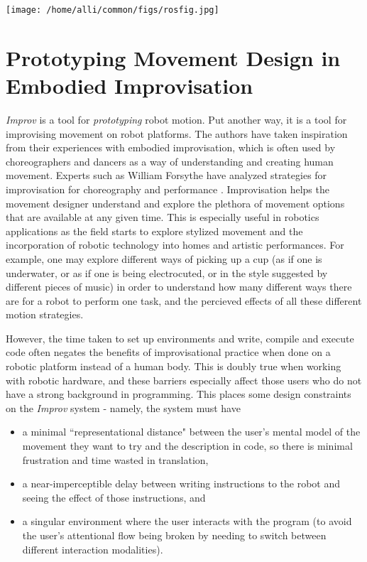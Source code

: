 \documentclass[sigconf]{acmart}
\begin{document}
\begin{figure*}
 \centering
\texttt{[image: /home/alli/common/figs/rosfig.jpg]}
\end{figure*}



\section{Prototyping Movement Design in Embodied Improvisation}\label{embodied}

\emph{Improv} is a tool for \emph{prototyping} robot motion. Put another way, it
is a tool for improvising movement on robot platforms. The authors have taken
inspiration from their experiences with embodied improvisation, which is often
used by choreographers and dancers as a way of understanding and creating human
movement. Experts such as William Forsythe have analyzed strategies for
improvisation for choreography and performance \cite{forsythe2004improvisation}.
Improvisation helps the movement designer understand and explore the plethora of
movement options that are available at any given time. This is especially useful
in robotics applications as the field starts to explore stylized movement and
the incorporation of robotic technology into homes and artistic performances. For
example, one may explore different ways of picking up a cup (as if one is
underwater, or as if one is being electrocuted, or in the style suggested by
different pieces of music) in order to understand how many different ways there
are for a robot to perform one task, and the percieved effects of all these
different motion strategies.

However, the time taken to set up environments and write, compile and
execute code often negates the benefits of improvisational practice when done
on a robotic platform instead of a human body. This is
doubly true when working with robotic hardware, and these barriers especially
affect those users who do not have a strong background in programming. This places
some design constraints on the \emph{Improv} system - namely, the system must
have

\begin{itemize}
\item a minimal ``representational
distance" between the user's mental model of the movement they want to try and
the description in code, so there is minimal frustration and time wasted in
translation,
\item a near-imperceptible delay between writing instructions to the robot and
seeing the effect of those instructions, and
\item a singular environment where the
user interacts with the program (to avoid the user's attentional flow being
broken by needing to switch between different interaction modalities).
\end{itemize}
\end{document}
